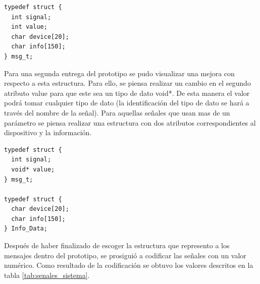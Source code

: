 \begin{lstlisting}[style=C]
typedef struct {
  int signal;
  int value;
  char device[20];
  char info[150];
} msg_t;
\end{lstlisting}

Para una segunda entrega del prototipo se pudo visualizar una mejora con respecto a esta estructura. Para ello, se piensa realizar un cambio en el segundo atributo value para que este sea un tipo de dato void*. De esta manera el valor podrá tomar cualquier tipo de dato (la identificación del tipo de dato se hará a través del nombre de la señal). Para aquellas señales que usan mas de un parámetro se piensa realizar una estructura con dos atributos correspondientes al dispositivo y la información. 

\begin{lstlisting}[style=C]
typedef struct {
  int signal;
  void* value;
} msg_t;

typedef struct {
  char device[20];
  char info[150];
} Info_Data;

\end{lstlisting}

Después de haber finalizado de escoger la estructura que represento a los mensajes dentro del prototipo, se prosiguió a codificar las señales con un valor numérico. Como resultado de la codificación se obtuvo los valores descritos en la tabla \ref{tab:senales_sistema}.

\begin{table}[!h]
\caption{Señales del sistema con su identificador en el código}
\label{tab:senales_sistema}
\end{table}
\pagebreak

